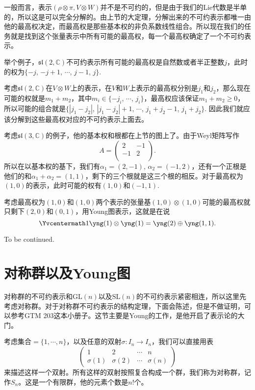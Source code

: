 \documentclass[9pt]{extarticle}
\newcommand{\cc}{\mathbb{C}}
\begin{document}
\para 一般而言，表示$(\rho\otimes\pi,V\otimes W)$并不是不可约的，但是由于我们的Lie代数是半单的，所以这是可以完全分解的。由上节的大定理，分解出来的不可约表示都唯一由他的最高权决定，而最高权是那些基本权的非负系数线性组合。所以现在我们的任务就是找到这个张量表示中所有可能的最高权，每一个最高权确定了一个不可约表示。

\para 举个例子，$\mathfrak{sl}(2,\cc)$不可约表示所有可能的最高权是自然数或者半正整数$j$，此时的权为$\{-j$, $-j+1$, $\cdots$, $j-1$, $j\}$.

考虑$\mathfrak{sl}(2,\cc)$在$V\otimes W$上的表示，在$V$和$W$上表示的最高权分别是$j_1$和$j_2$，那么现在可能的权就是$m_1+m_2$，其中$m_i\in\{-j_i$, $\cdots$, $j_i\}$，最高权应该保证$m_1+m_2\geq 0$，所以可能的组合就是$\{|j_1-j_2|$, $|j_1-j_2|+1$, $\cdots$, $j_1+j_2-1$, $j_1+j_2\}$. 因此我们就应该分解到这些最高权对应的不可约表示上面去。

\para 考虑$\mathfrak{sl}(3,\cc)$的例子，他的基本权和根都在上节的图上了。由于Weyl矩阵写作
\[
	A=\begin{pmatrix}
	2&-1\\
	-1&2\\
	\end{pmatrix}.
\]
所以在以基本权的基下，我们有$\alpha_1=(2,-1)$, $\alpha_2=(-1,2)$，还有一个正根是他们的和$\alpha_1+\alpha_2=(1,1)$，剩下的三个根就是这三个根的相反。对于最高权为$(1,0)$的表示，此时可能的权有$(1,0)$和$(-1,1)$. 

考虑最高权为$(1,0)$和$(1,0)$两个表示的张量基$(1,0)\otimes (1,0)$可能的最高权就只剩下$(2,0)$和$(0,1)$，用Young图表示，这就是在说
\[
\Yvcentermath1
\yng(1)\otimes \yng(1)=\yng(2)\oplus\yng(1,1).
\]

To be continued.

\section{对称群以及Young图}

对称群的不可约表示和$\mathrm{GL}(n)$以及$\mathrm{SL}(n)$的不可约表示紧密相连，所以这里先考虑对称群。对于对称群不可约表示的结构定理，下面会陈述，但是不做证明，可以参考GTM 203这本小册子。这节主要是Young的工作，是他开启了表示论的大门。

\para 考虑集合$=\{1,\cdots,n\}$，以及任意的双射$\sigma : I_n\to I_n$，我们可以直接用表
\[
	\begin{pmatrix}
	1&2&\cdots &n\\
	\sigma(1)&\sigma(2)&\cdots &\sigma(n)
	\end{pmatrix}
\]
来描述这样一个双射。所有这样的双射按照复合构成一个群，我们称为对称群，记作$S_n$。这是一个有限群，他的元素个数是$n!$个。
\end{document}

